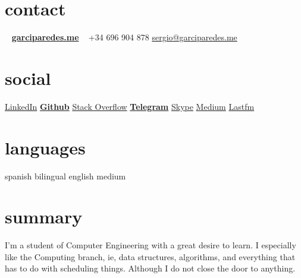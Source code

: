 \documentclass[]{friggeri-cv} %
\begin{document}


    \begin{aside} %

        \section{contact}
            ~
            \href{http://garciparedes.me}{\textbf{garciparedes.me}}
            ~
            +34 696 904 878
            \href{mailto:sergio@garciparedes.me}{sergio@garciparedes.me}
        \section{social}
            \href{https://es.linkedin.com/in/garciparedes/en}{LinkedIn\quad\faLinkedin }
            \href{https://github.com/garciparedes}{\quad{\color{red} $\varheartsuit$}\quad\textbf{Github}\quad\faGithub }
            \href{http://stackoverflow.com/users/3921457/garciparedes}{Stack Overflow\quad\faStackOverflow }
            \href{https://telegram.me/garciparedes}{\textbf{Telegram}\quad\faPaperPlane }
            \href{skype:garciparedes?call}{Skype\quad\faSkype }
            \href{https://medium.com/@garciparedes}{Medium\quad\faMedium }
            \href{http://www.last.fm/user/garciparedes/}{Lastfm\quad\faLastfm}
        \section{languages}
            spanish bilingual
            english medium
    \end{aside}




    \section{summary}

        I'm a student of Computer Engineering with a great desire to learn. I especially like the Computing branch, ie, data structures, algorithms, and everything that has to do with scheduling things. Although I do not close the door to anything.
\end{document}

